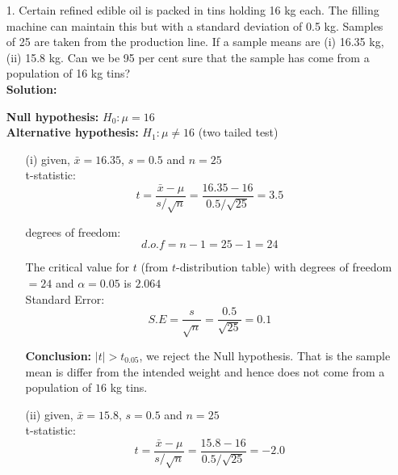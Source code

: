 \documentclass[a4paper,11pt,openright]{report}
\begin{document}
\begin{enumerate}

\item[1.] Certain refined edible oil is packed in tins holding 16 kg each. The filling
machine can maintain this but with a standard deviation of 0.5 kg. Samples of 25 are taken
from the production line. If a sample means are (i) 16.35 kg, (ii) 15.8 kg. Can we be 95 per
cent sure that the sample has come from a population of 16 kg tins? \\

\textbf{Solution:}

\textbf{Null hypothesis:} $H_{0}: \mu = 16$ \\
\textbf{Alternative hypothesis:} $H_{1}: \mu \neq 16$ \hspace{5px} (two tailed test)

\begin{enumerate}
\item[(i)] given, $\bar x = 16.35$, $s = 0.5$ and $n = 25$ \\

t-statistic:
\begin{equation*}
t = \frac{\bar x - \mu}{s/\sqrt{n}}
  = \frac{16.35 - 16}{0.5/\sqrt{25}} 
  = 3.5
\end{equation*}

degrees of freedom:
\begin{equation*}
d.o.f = n - 1 = 25 - 1 = 24
\end{equation*}

The critical value for $t$ (from $t$-distribution table) with degrees of freedom $= 24$ and
$\alpha = 0.05$ is $2.064$ \\

Standard Error:
\begin{equation*}
S.E = \frac{s}{\sqrt{n}} = \frac{0.5}{\sqrt{25}} = 0.1
\end{equation*}

\textbf{Conclusion:} $|t| > t_{0.05}$, we reject the Null hypothesis. That is the sample
mean is differ from the intended weight and hence does not come from a population of $16$ kg
tins. \\

\item[(ii)] given, $\bar x = 15.8$, $s = 0.5$ and $n = 25$ \\

t-statistic:
\begin{equation*}
t = \frac{\bar x - \mu}{s/\sqrt{n}}
  = \frac{15.8 - 16}{0.5/\sqrt{25}}
  = -2.0
\end{equation*}	


\end{enumerate}
\end{enumerate}
\end{document}
